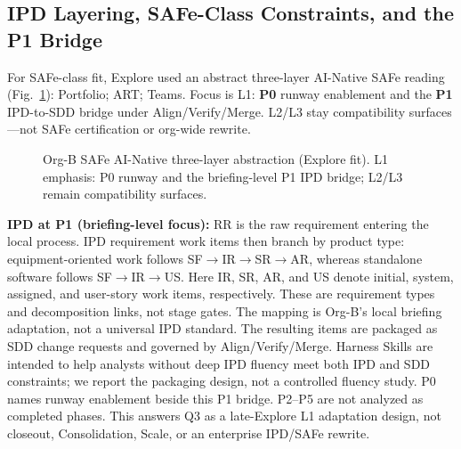 \documentclass[10pt,conference]{IEEEtran}
\begin{document}
\subsection{IPD Layering, SAFe-Class Constraints, and the P1 Bridge}
\label{sec:org-b-fit}

For SAFe-class fit, Explore used an abstract three-layer AI-Native SAFe reading
(Fig.~\ref{fig:org-b-safe}): Portfolio; ART; Teams.
Focus is L1: \textbf{P0} runway enablement and the
\textbf{P1} IPD-to-SDD bridge under Align/Verify/Merge.
L2/L3 stay compatibility surfaces---not SAFe certification or org-wide rewrite.

\begin{figure}[t]
\centering
{}
\caption{Org-B SAFe AI-Native three-layer abstraction (Explore fit).
L1 emphasis: P0 runway and the briefing-level P1 IPD bridge; L2/L3 remain
compatibility surfaces.}
\label{fig:org-b-safe}
\end{figure}

\textbf{IPD at P1 (briefing-level focus):} RR is the raw requirement entering
the local process. IPD requirement work items then branch by product type:
equipment-oriented work follows SF$\rightarrow$IR$\rightarrow$SR$\rightarrow$AR,
whereas standalone software follows SF$\rightarrow$IR$\rightarrow$US. Here IR,
SR, AR, and US denote initial, system, assigned, and user-story work items,
respectively. These are requirement types and decomposition links, not stage
gates. The mapping is Org-B's local briefing adaptation, not a universal IPD
standard. The resulting items are packaged as SDD change requests and governed
by Align/Verify/Merge. Harness Skills are intended to help analysts without
deep IPD fluency meet both IPD and SDD constraints; we report the packaging
design, not a controlled fluency study. P0 names runway enablement beside this
P1 bridge. P2--P5 are not analyzed as completed phases. This answers Q3 as a
late-Explore L1 adaptation design, not closeout, Consolidation, Scale, or an
enterprise IPD/SAFe rewrite.
\end{document}
